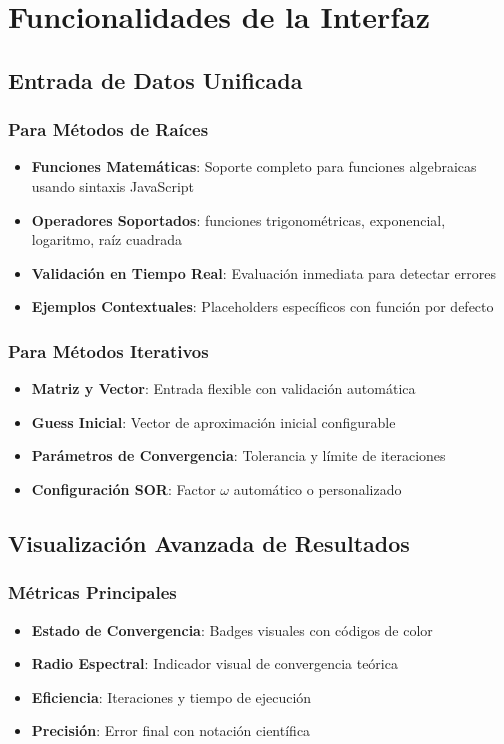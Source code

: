 \section{Funcionalidades de la Interfaz}

\subsection{Entrada de Datos Unificada}

\subsubsection{Para Métodos de Raíces}
\begin{itemize}
    \item \textbf{Funciones Matemáticas}: Soporte completo para funciones algebraicas usando sintaxis JavaScript
    \item \textbf{Operadores Soportados}: funciones trigonométricas, exponencial, logaritmo, raíz cuadrada
    \item \textbf{Validación en Tiempo Real}: Evaluación inmediata para detectar errores
    \item \textbf{Ejemplos Contextuales}: Placeholders específicos con función por defecto
\end{itemize}

\subsubsection{Para Métodos Iterativos}
\begin{itemize}
    \item \textbf{Matriz y Vector}: Entrada flexible con validación automática
    \item \textbf{Guess Inicial}: Vector de aproximación inicial configurable
    \item \textbf{Parámetros de Convergencia}: Tolerancia y límite de iteraciones
    \item \textbf{Configuración SOR}: Factor $\omega$ automático o personalizado
\end{itemize}

\subsection{Visualización Avanzada de Resultados}

\subsubsection{Métricas Principales}
\begin{itemize}
    \item \textbf{Estado de Convergencia}: Badges visuales con códigos de color
    \item \textbf{Radio Espectral}: Indicador visual de convergencia teórica
    \item \textbf{Eficiencia}: Iteraciones y tiempo de ejecución
    \item \textbf{Precisión}: Error final con notación científica
\end{itemize}

